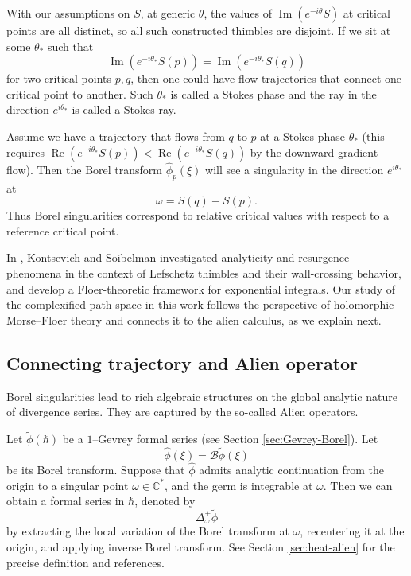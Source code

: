 \documentclass[11pt]{amsart}
\theoremstyle{plain}
\theoremstyle{definition}
\newcommand{\C}{\mathbb{C}}
\DeclareMathOperator{\re}{Re}
\DeclareMathOperator{\im}{Im}
\begin{document}
With our assumptions on $S$, at generic $\theta$, the values of $\im(e^{-i\theta}S)$ at critical points are all distinct, so all such constructed thimbles are disjoint. If we sit at some $\theta_*$ such that
$$
\im(e^{-i\theta_*}S(p))=\im(e^{-i\theta_*}S(q))
$$
for two critical points $p,q$, then one could have flow trajectories that connect one critical point to another.  Such $\theta_*$ is called a Stokes phase and the ray in the direction $e^{i\theta_*}$ is called a Stokes ray. 

Assume we have a trajectory that flows from $q$ to $p$ at a Stokes phase $\theta_*$ (this requires $\re(e^{-i\theta_*}S(p))<\re(e^{-i\theta_*}S(q))$ by the downward gradient flow). Then the Borel transform $\hat \phi_p(\xi)$ will see a singularity in the direction $e^{i\theta_*}$ at 
$$
\omega=S(q)-S(p).
$$
Thus Borel singularities correspond to relative critical values with respect to a reference critical point.

In  \cite{KS-2022,KS-2024}, Kontsevich and Soibelman investigated analyticity and resurgence phenomena in the context of Lefschetz thimbles and their wall-crossing behavior, and develop a Floer-theoretic framework for exponential integrals. Our study of the complexified path space in this work follows the perspective of holomorphic Morse–Floer theory and connects it to the alien calculus, as we explain next.


\subsection{Connecting trajectory and Alien operator}\label{sec:intro-Alien} Borel singularities lead to rich algebraic structures on the global analytic nature of divergence series. They are captured by the so-called Alien operators.  

Let $\widetilde\phi(\hbar)$ 
be a $1$--Gevrey formal series (see Section \ref{sec:Gevrey-Borel}). Let
\[
\widehat\phi(\xi)=\mathcal B\widetilde\phi(\xi)
\]
be its Borel transform.  Suppose that $\widehat\phi$ admits analytic
continuation from the origin to a singular point $\omega\in\C^*$, and the germ is integrable at $\omega$. Then we can obtain a formal series in $\hbar$, denoted by  $$
\Delta_{\omega}^{+}\widetilde\phi
$$
by extracting the local
variation of the Borel transform at $\omega$, recentering it at the origin,
and applying inverse Borel transform. See Section \ref{sec:heat-alien} for the precise definition and references. 
\end{document}
